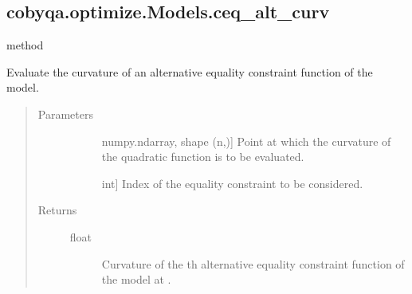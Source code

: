 \documentclass[letterpaper,10pt,english]{sphinxmanual}
\begin{document}
\begin{fulllineitems}
\begin{fulllineitems}
\begin{quote}
\begin{description}
\begin{description}
\end{description}

\end{description}\end{quote}

\end{fulllineitems}



\subsection{cobyqa.optimize.Models.ceq\_alt\_curv}
\label{\detokenize{refs/generated/cobyqa.optimize.Models.ceq_alt_curv:cobyqa-optimize-models-ceq-alt-curv}}\label{\detokenize{refs/generated/cobyqa.optimize.Models.ceq_alt_curv::doc}}
\sphinxAtStartPar
method

\begin{fulllineitems}
\label{\detokenize{refs/generated/cobyqa.optimize.Models.ceq_alt_curv:cobyqa.optimize.Models.ceq_alt_curv}}
\sphinxAtStartPar
Evaluate the curvature of an alternative equality constraint function of
the model.
\begin{quote}\begin{description}
\item[{Parameters}] \leavevmode\begin{description}
\item[{}] \leavevmode{[}numpy.ndarray, shape (n,){]}
\sphinxAtStartPar
Point at which the curvature of the quadratic function is to be
evaluated.

\item[{}] \leavevmode{[}int{]}
\sphinxAtStartPar
Index of the equality constraint to be considered.

\end{description}

\item[{Returns}] \leavevmode\begin{description}
\item[{float}] \leavevmode
\sphinxAtStartPar
Curvature of the \sphinxhyphen{}th alternative equality constraint function of
the model at .


\end{description}
\end{description}
\end{quote}
\end{fulllineitems}
\end{fulllineitems}
\end{document}
